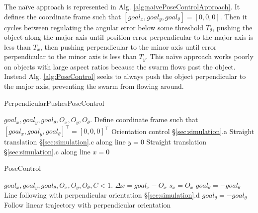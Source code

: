 The na\"{i}ve approach is represented in Alg. \ref{alg:naivePoseControlApproach}. It defines  the coordinate frame such that $[goal_x, goal_y, goal_{\theta}] = [0,0,0]$.
Then it cycles between regulating the angular error below some threshold $T_{\theta}$,
pushing the object along the major axis until position error perpendicular to the major axis is less than $T_x$, then pushing perpendicular to the minor axis until error perpendicular to the minor axis is less than $T_y$. 
This na\"{i}ve approach works poorly on objects with large aspect ratios because the swarm flows past the object. 
Instead Alg. \ref{alg:PoseControl} seeks to always push the object perpendicular to the major axis, preventing the swarm from flowing around. 


\begin{algorithm}
\caption{PerpendicularPushesPoseControl}\label{alg:naivePoseControlApproach}
\begin{algorithmic}[1]
\Require $goal_x, goal_y, goal_{\theta},O_x, O_y, O_{\theta}$.
\State Define coordinate frame such that $[goal_x, goal_y, goal_{\theta}]^\top = [0,0,0]^\top$
		\State Orientation control \S\ref{sec:simulation}.a
	\EndWhile
		\State Straight translation \S\ref{sec:simulation}.c along line $y = 0$
	\EndWhile
		\State Straight translation \S\ref{sec:simulation}.c along line $x = 0$
	\EndWhile
\EndWhile
\end{algorithmic}
\end{algorithm}



\begin{algorithm}
\caption{PoseControl}\label{alg:PoseControl}
\begin{algorithmic}[1]
\Require $goal_x, goal_y, goal_{\theta},O_x, O_y, O_{\theta}, C<1$.
\State $\Delta x = goal_x - O_x$
\State $s_x = O_x$ 
\State $goal_{\theta} = -goal_{\theta}$ 
\State Line following with perpendicular orientation \S\ref{sec:simulation}.d
\EndWhile
\State $goal_{\theta} = -goal_{\theta}$
\State Follow linear trajectory with perpendicular orientation
\end{algorithmic}
\end{algorithm}



